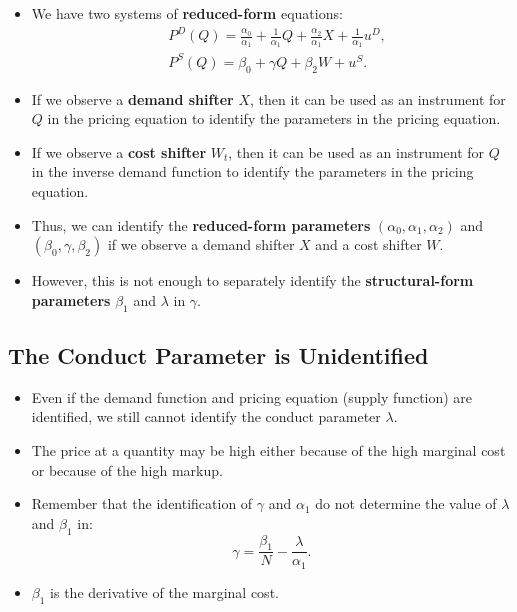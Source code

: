 \documentclass[
]{book}
\providecommand{\tightlist}{%
  \setlength{\itemsep}{0pt}\setlength{\parskip}{0pt}}
\begin{document}
\begin{itemize}
\tightlist
\item
  We have two systems of \textbf{reduced-form} equations:
  \begin{equation}
  \begin{split}
  &P^D(Q) = \frac{\alpha_0}{\alpha_1} + \frac{1}{\alpha_1}Q + \frac{\alpha_2}{\alpha_1} X + \frac{1}{\alpha_1}u^D,\\
  &P^S(Q) = \beta_0 + \gamma Q + \beta_2 W + u^S.
  \end{split}
  \end{equation}
\item
  If we observe a \textbf{demand shifter} \(X\), then it can be used as an instrument for \(Q\) in the pricing equation to identify the parameters in the pricing equation.
\item
  If we observe a \textbf{cost shifter} \(W_t\), then it can be used as an instrument for \(Q\) in the inverse demand function to identify the parameters in the pricing equation.
\item
  Thus, we can identify the \textbf{reduced-form parameters} \((\alpha_0, \alpha_1, \alpha_2)\) and \((\beta_0, \gamma, \beta_2)\) if we observe a demand shifter \(X\) and a cost shifter \(W\).
\item
  However, this is not enough to separately identify the \textbf{structural-form parameters} \(\beta_1\) and \(\lambda\) in \(\gamma\).
\end{itemize}

\hypertarget{the-conduct-parameter-is-unidentified}{%
\subsection{The Conduct Parameter is Unidentified}\label{the-conduct-parameter-is-unidentified}}

\begin{itemize}
\tightlist
\item
  Even if the demand function and pricing equation (supply function) are identified, we still cannot identify the conduct parameter \(\lambda\).
\item
  The price at a quantity may be high either because of the high marginal cost or because of the high markup.
\item
  Remember that the identification of \(\gamma\) and \(\alpha_1\) do not determine the value of \(\lambda\) and \(\beta_1\) in:
  \begin{equation}
  \gamma = \frac{\beta_1}{N} - \frac{\lambda}{\alpha_1}.
  \end{equation}
\item
  \(\beta_1\) is the derivative of the marginal cost.
\end{itemize}
\end{document}
